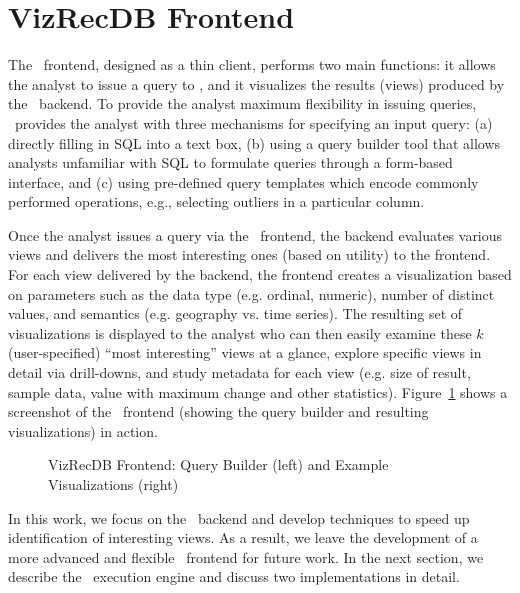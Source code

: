 

\section{VizRecDB Frontend}
\label{sec:VizRecDB_frontend}

The \VizRecDB\ frontend, designed as a thin client, performs two main functions: it
allows the analyst to issue a query to \VizRecDB, 
and it visualizes the results (views) produced by the \VizRecDB\
backend.
To provide the analyst maximum flexibility in issuing queries, \VizRecDB\
provides the analyst with three
mechanisms for specifying an input query: 
(a) directly filling in SQL into a text box, 
(b) using a query builder tool that allows analysts
unfamiliar with SQL to formulate queries through a form-based interface, and (c)
using pre-defined query templates which encode commonly performed operations,
e.g., selecting outliers in a particular column. 

Once the analyst issues a query via the \VizRecDB\ frontend, the backend
evaluates various views and delivers the most interesting ones (based on
utility) to the frontend.
For each view delivered by the backend, the frontend creates a visualization
based on parameters such as the data
type (e.g. ordinal, numeric), number of distinct values, and semantics (e.g.
geography vs. time series).
The resulting set of  visualizations is displayed to the analyst who can then
easily examine these $k$ (user-specified) ``most interesting'' views at a glance, 
explore specific views in detail via drill-downs, 
and study metadata for each view (e.g. size of result, sample data, value with
maximum change and other statistics). 
Figure~\ref{fig:frontend1} shows a screenshot of the \VizRecDB\ frontend (showing
the query builder and resulting visualizations) in action.
 
\begin{figure}[htb]
\vspace{-10pt}
\centerline{
\hbox{}
\hbox{}}
\caption{VizRecDB Frontend: Query Builder (left) and Example Visualizations
(right)}
\label{fig:frontend1}
\vspace{-10pt}
\end{figure} 

In this work, we focus on the \VizRecDB\ backend and develop techniques to
speed up identification of interesting views. As a result, we leave the
development of a more advanced and flexible \VizRecDB\ frontend for future work. 
In the next section, we describe the \VizRecDB\ execution engine and discuss
two implementations in detail.
